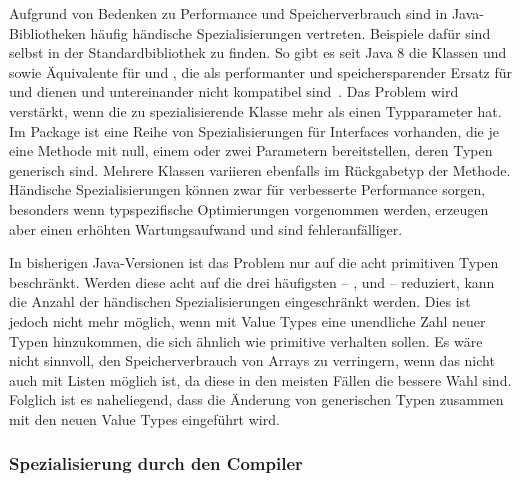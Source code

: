 Aufgrund von Bedenken zu Performance und Speicherverbrauch sind in Java-Bibliotheken häufig händische Spezialisierungen vertreten.
Beispiele dafür sind selbst in der Standardbibliothek zu finden.
So gibt es seit Java 8 die Klassen  und  sowie Äquivalente für  und , die als performanter und speichersparender Ersatz für  und  dienen und untereinander nicht kompatibel sind~\cite{java-8-docs}.
Das Problem wird verstärkt, wenn die zu spezialisierende Klasse mehr als einen Typparameter hat.
Im Package  ist eine Reihe von Spezialisierungen für Interfaces vorhanden, die je eine Methode mit null, einem oder zwei Parametern bereitstellen, deren Typen generisch sind.
Mehrere Klassen variieren ebenfalls im Rückgabetyp der Methode.
Händische Spezialisierungen können zwar für verbesserte Performance sorgen, besonders wenn typspezifische Optimierungen vorgenommen werden, erzeugen aber einen erhöhten Wartungsaufwand und sind fehleranfälliger.

In bisherigen Java-Versionen ist das Problem nur auf die acht primitiven Typen beschränkt.
Werden diese acht auf die drei häufigsten -- ,  und  -- reduziert, kann die Anzahl der händischen Spezialisierungen eingeschränkt werden.
Dies ist jedoch nicht mehr möglich, wenn mit Value Types eine unendliche Zahl neuer Typen hinzukommen, die sich ähnlich wie primitive verhalten sollen.
Es wäre nicht sinnvoll, den Speicherverbrauch von Arrays zu verringern, wenn das nicht auch mit Listen möglich ist, da diese in den meisten Fällen die bessere Wahl sind.
Folglich ist es naheliegend, dass die Änderung von generischen Typen zusammen mit den neuen Value Types eingeführt wird.

\subsubsection{Spezialisierung durch den Compiler}

